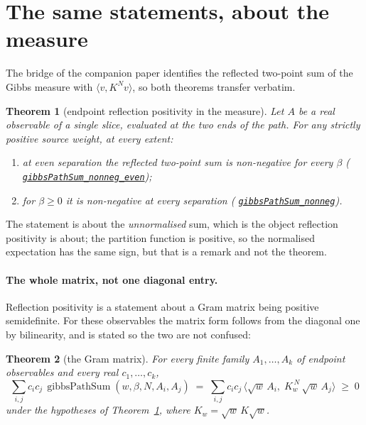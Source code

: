 \documentclass[11pt]{article}
\newtheorem{theorem}{Theorem}[section]
\theoremstyle{definition}
\newcommand{\anchor}{854ff223396630a8a75b0a95a3ada6413f3a395d}
\newcommand{\osline}[3]{%
  \href{https://github.com/lluiseriksson/THE-ERIKSSON-PROGRAMME/blob/\anchor/YangMills/OS/#1.lean\#L#2}{\nolinkurl{#3}}}
\begin{document}
\section{The same statements, about the measure}\label{sec:measure}

The bridge of the companion paper \cite{ErikssonGibbs} identifies the reflected
two-point sum of the Gibbs measure with $\langle v, K^{N} v\rangle$, so both
theorems transfer verbatim.

\begin{theorem}[endpoint reflection positivity in the measure]\label{thm:rp}
Let $A$ be a \emph{real} observable of a \emph{single} slice, evaluated at the
two ends of the path.  For any strictly positive source weight, at every extent:
\begin{enumerate}
\item at even separation the reflected two-point sum is non-negative for
\emph{every} $\beta$
(\osline{SpatialReflection}{267}{gibbsPathSum\_nonneg\_even});
\item for $\beta\ge0$ it is non-negative at \emph{every} separation
(\osline{SpatialReflection}{276}{gibbsPathSum\_nonneg}).
\end{enumerate}
\end{theorem}

The statement is about the \emph{unnormalised} sum, which is the object
reflection positivity is about; the partition function is positive, so the
normalised expectation has the same sign, but that is a remark and not the
theorem.

\paragraph{The whole matrix, not one diagonal entry.}  Reflection positivity is
a statement about a Gram matrix being positive semidefinite.  For these
observables the matrix form follows from the diagonal one by bilinearity, and is
stated so the two are not confused:

\begin{theorem}[the Gram matrix]\label{thm:gram}
For every finite family $A_1,\dots,A_k$ of endpoint observables and every real
$c_1,\dots,c_k$,
\[
  \sum_{i,j} c_i c_j \,
    \operatorname{gibbsPathSum}(w,\beta,N,A_i,A_j) \;=\;
  \sum_{i,j} c_i c_j \,
    \bigl\langle \sqrt{w}\,A_i,\; K_w^{\,N}\, \sqrt{w}\,A_j \bigr\rangle
  \;\ge\; 0
\]
under the hypotheses of Theorem~\ref{thm:rp}, where $K_w=\sqrt{w}\,K\sqrt{w}$.
\end{theorem}
\end{document}
